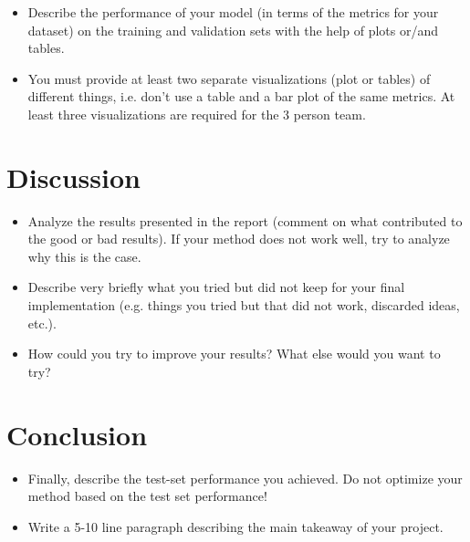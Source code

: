 \documentclass[a4, 10 pt, conference]{ieeeconf}  %
\begin{document}
{\color{blue}

  \begin{itemize}
    \item Describe the performance of your model (in terms of the metrics for your dataset) on the training and validation sets with the help of plots or/and tables.
    \item You must provide at least two separate visualizations
          (plot or tables) of different things, i.e. don’t use a table
          and a bar plot of the same metrics. At least three
          visualizations are required for the 3 person team.
  \end{itemize}
}

\section{Discussion}
\label{sec:discuss}

{\color{blue}
  \begin{itemize}
    \item Analyze the results presented in the report (comment on what contributed to the good or bad results). If your method does not work well, try to analyze why this is the case.
    \item Describe very briefly what you tried but did not keep for your final implementation (e.g. things you tried but that did not work, discarded ideas, etc.).
    \item How could you try to improve your results? What else would you want to try?

  \end{itemize}
}

\section{Conclusion}
\label{sec:con}

{\color{blue}

  \begin{itemize}
    \item Finally, describe the test-set performance you achieved. Do not
          optimize your method based on the test set performance!
    \item Write a 5-10 line paragraph describing the main takeaway of your project.
  \end{itemize}

}

\end{document}
